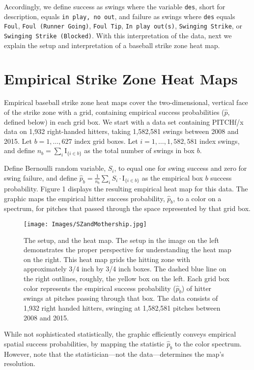 Accordingly, we define success as swings where the variable \verb|des|, short for description, equals \verb|in play, no out|, and failure as swings where \verb|des| equals \verb|Foul|, \verb|Foul (Runner Going)|, \verb|Foul Tip|, \verb|In play out(s)|, \verb|Swinging Strike|, or \\ \verb|Swinging Strike (Blocked)|. With this interpretation of the data, next we explain the setup and interpretation of a baseball strike zone heat map.

\section{Empirical Strike Zone Heat Maps}

Empirical baseball strike zone heat maps cover the two-dimensional, vertical face of the strike zone with a grid, containing empirical success probabilities ($\hat{p}$, defined below) in each grid box.  We start with a data set containing PITCHf/x\textsuperscript{\textregistered} data on 1,932 right-handed hitters, taking 1,582,581 swings between 2008 and 2015.  Let $b = 1, \dots, 627$ index grid boxes. Let $i = 1, \dots, 1,582,581$ index swings, and define $n_{b} = \displaystyle\sum_{i} \text{I}_{\{i \in b \}}$ as the total number of swings in box $b$.

Define Bernoulli random variable, $S_{i}$, to equal one for swing success and zero for swing failure, and define $\hat{p}_{b} = \frac{1}{n_{b}} \displaystyle\sum_{i} S_{i} \cdot \text{I}_{\{i \in b \}}$ as the empirical box $b$ success probability. Figure 1 displays the resulting empirical heat map for this data. The graphic maps the empirical hitter success probability, $\hat{p}_{b}$, to a color on a spectrum, for pitches that passed through the space represented by that grid box.
  \begin{figure}[H]
	\centering
	\texttt{[image: Images/SZandMothership.jpg]} 
  \caption{The setup, and the heat map. The setup in the image on the left demonstrates the proper perspective for understanding the heat map on the right. This heat map grids the hitting zone with approximately 3/4 inch by 3/4 inch boxes. The dashed blue line on the right outlines, roughly, the yellow box on the left. Each grid box color represents the empirical success probability ($\hat{p}_{b}$) of hitter swings at pitches passing through that box.  The data consists of 1,932 right handed hitters, swinging at 1,582,581 pitches between 2008 and 2015.}
	\end{figure} 
While not sophisticated statistically, the graphic efficiently conveys empirical spatial success probabilities, by mapping the statistic $\hat{p}_{b}$ to the color spectrum. However, note that the statistician---not the data---determines the map's resolution.

